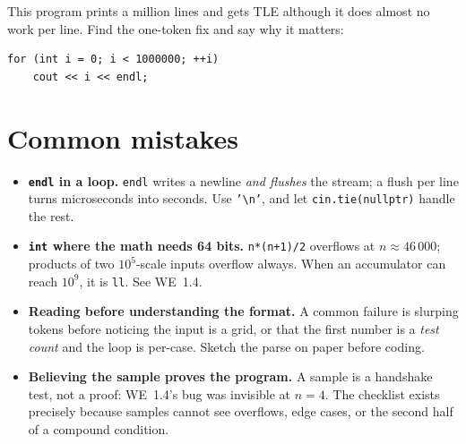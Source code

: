 \begin{exercise}[medium]\label{exr:fixwa}
This program prints a million lines and gets TLE although it does almost no
work per line. Find the one-token fix and say why it matters:
\begin{lstlisting}
for (int i = 0; i < 1000000; ++i)
    cout << i << endl;
\end{lstlisting}
\end{exercise}

\section{Common mistakes}

\begin{itemize}
\item \textbf{\texttt{endl} in a loop.} \texttt{endl} writes a newline
\emph{and flushes} the stream; a flush per line turns microseconds into
seconds. Use \texttt{'\textbackslash n'}, and let \texttt{cin.tie(nullptr)}
handle the rest.
\item \textbf{\texttt{int} where the math needs 64 bits.}
\texttt{n*(n+1)/2} overflows at $n \approx 46\,000$; products of two
$10^5$-scale inputs overflow always. When an accumulator can reach $10^9$,
it is \texttt{ll}. See WE~1.4.
\item \textbf{Reading before understanding the format.} A common failure is
slurping tokens before noticing the input is a grid, or that the first
number is a \emph{test count} and the loop is per-case. Sketch the parse on
paper before coding.
\item \textbf{Believing the sample proves the program.} A sample is a
handshake test, not a proof: WE~1.4's bug was invisible at $n=4$. The
checklist exists precisely because samples cannot see overflows, edge
cases, or the second half of a compound condition.
\end{itemize}

